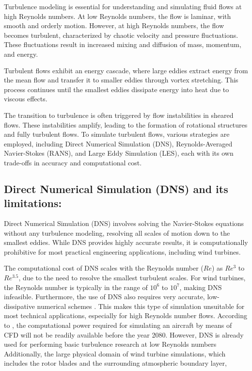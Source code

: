 Turbulence modeling is essential for understanding and simulating fluid flows at high Reynolds numbers. At low Reynolds numbers, the flow is laminar, with smooth and orderly motion. However, at high Reynolds numbers, the flow becomes turbulent, characterized by chaotic velocity and pressure fluctuations. These fluctuations result in increased mixing and diffusion of mass, momentum, and energy.

Turbulent flows exhibit an energy cascade, where large eddies extract energy from the mean flow and transfer it to smaller eddies through vortex stretching. This process continues until the smallest eddies dissipate energy into heat due to viscous effects.

The transition to turbulence is often triggered by flow instabilities in sheared flows. These instabilities amplify, leading to the formation of rotational structures and fully turbulent flows. To simulate turbulent flows, various strategies are employed, including Direct Numerical Simulation (DNS), Reynolds-Averaged Navier-Stokes (RANS), and Large Eddy Simulation (LES), each with its own trade-offs in accuracy and computational cost.

\subsection{Direct Numerical Simulation (DNS) and its limitations:}
Direct Numerical Simulation (DNS) involves solving the Navier-Stokes equations without any turbulence modeling, 
resolving all scales of motion down to the smallest eddies. While DNS provides highly accurate results, 
it is computationally prohibitive for most practical engineering applications, including wind turbines.

The computational cost of DNS scales with the Reynolds number ($Re$) as $Re^{3}$ to $Re^{3.5}$, 
due to the need to resolve the smallest turbulent scales. For wind turbines, the Reynolds number is typically in the range of $10^6$ to $10^7$, 
making DNS infeasible. Furthermore, the use of DNS also requires very accurate, low-dissipative numerical schemes
\cite{mocket2009}. This makes this type of simulation unsuitable for most technical applications,
especially for high Reynolds number flows. According to \cite{spalart2000}, the computational
power required for simulating an aircraft by means of CFD will not be readily available before
the year 2080. However, DNS is already used for performing basic turbulence research at low
Reynolds numbers 
Additionally, the large physical domain of wind turbine simulations, which includes the rotor blades and the surrounding atmospheric boundary layer, 
